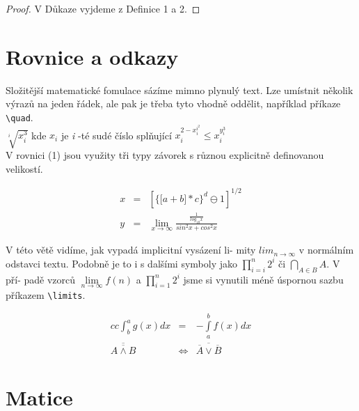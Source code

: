 \documentclass[a4paper,11pt,twocolumn]{article}
\begin{document}
\begin{proof}
V Důkaze vyjdeme z Definice 1 a 2.
\end{proof}

\section{Rovnice a odkazy}

Složitější matematické fomulace sázíme mimno plynulý text. Lze umístnit několik výrazů na jeden řádek, ale pak je třeba tyto vhodně oddělit, například příkaze \verb|\quad|.
\\

$\sqrt[i]{x^3_i}$ kde $x_i$ je \emph{i} -té sudé číslo splňující $x_i^{2-x_i^{i^2}} \le x_i^{y_i^3}$
\\

V rovnici (1) jsou využity tři typy závorek s různou explicitně definovanou velikostí.

\begin{eqnarray}
    x & = & \left[ \Big\{ \big[ a + b \big] * c \Big\}^d \ominus 1 \right]^{1/2}
    \\
    y & = & \lim_{x\to \infty} \frac{\frac{1}{log_10 x}}{sin^2x + cos^2x} \nonumber
\end{eqnarray}

V této větě vidíme, jak vypadá implicitní vysázení li-\linebreak
mity $lim_{n \to \infty}$ v normálním odstavci textu. Podobně\linebreak
je to i s dalšími symboly jako $\prod_{i=i}^{n} 2^{i}$ či $\bigcap_{A \in B} A.$ V pří-\linebreak 
padě vzorců $\lim \limits_{n\to \infty} f(n)$ a $\prod\limits_{i=1}^{n} 2^{i}$
jsme si vynutili \linebreak méně úspornou sazbu příkazem \verb!\limits!.


\begin{eqnarray}{cc}
    \int_b^a g(x) dx & = & -\int \limits_a^b \mathit{f}(x) dx
    \\
    \overline{\overline{A \land B}} & \Leftrightarrow & \overline{\overline{A} \lor \overline{B}}
\end{eqnarray}


\section{Matice}
\end{document}
